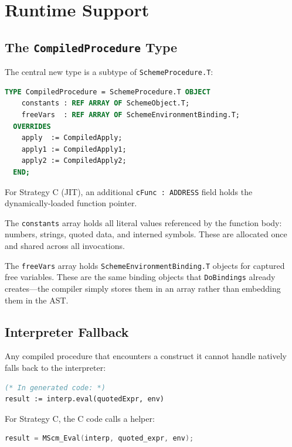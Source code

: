 \documentclass[12pt]{report}
\begin{document}
\chapter{Runtime Support}
\label{ch:runtime}

\section{The \texttt{CompiledProcedure} Type}

The central new type is a subtype of \texttt{SchemeProcedure.T}:

\begin{lstlisting}[language=Modula3]
TYPE CompiledProcedure = SchemeProcedure.T OBJECT
    constants : REF ARRAY OF SchemeObject.T;
    freeVars  : REF ARRAY OF SchemeEnvironmentBinding.T;
  OVERRIDES
    apply  := CompiledApply;
    apply1 := CompiledApply1;
    apply2 := CompiledApply2;
  END;
\end{lstlisting}

For Strategy C (JIT), an additional \texttt{cFunc : ADDRESS} field
holds the dynamically-loaded function pointer.

The \texttt{constants} array holds all literal values referenced
by the function body: numbers, strings, quoted data, and interned
symbols.  These are allocated once and shared across all invocations.

The \texttt{freeVars} array holds \texttt{SchemeEnvironmentBinding.T}
objects for captured free variables.  These are the same binding
objects that \texttt{DoBindings} already creates---the compiler
simply stores them in an array rather than embedding them in the
AST.

\section{Interpreter Fallback}

Any compiled procedure that encounters a construct it cannot handle
natively falls back to the interpreter:

\begin{lstlisting}[language=Modula3]
(* In generated code: *)
result := interp.eval(quotedExpr, env)
\end{lstlisting}

For Strategy C, the C code calls a helper:

\begin{lstlisting}[language=C]
result = MScm_Eval(interp, quoted_expr, env);
\end{lstlisting}
\end{document}
